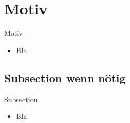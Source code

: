 \section{Motiv}

\begin{slide}{Motiv}
	\begin{itemize}
		\item Bla
	\end{itemize}
\end{slide}

\subsection{Subsection wenn nötig}

\begin{slide}{Subsection}
	\begin{itemize}
		\item Bla
	\end{itemize}
\end{slide}
